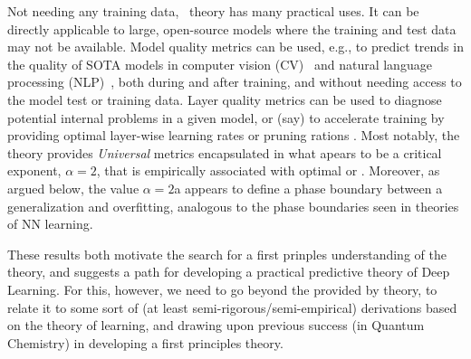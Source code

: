 Not needing any training data, \HTSR~theory has many practical uses.
It can be directly applicable to large, open-source  models where the training and test data may not be available.
Model quality metrics can be used, e.g., to predict trends in the quality of SOTA models in computer vision (CV)~\cite{MM20a_trends_NatComm} and natural language processing (NLP)~\cite{YTHx22_TR,YTHx23_KDD}, both during and after training, and without needing access to the model test or training data.
Layer quality metrics can be used to diagnose potential internal problems in a given model, or (say) to accelerate training by providing optimal layer-wise learning rates \cite{NEURIPS2023_CHM} or pruning rations \cite{alphapruning_NEURIPS2024}.
%
Most notably, the \HTSR theory provides \emph{Universal} \LayerQuality metrics encapsulated in what apears to be a critical exponent, $\alpha=2$, that is empirically associated with optimal or \IdealLearning. Moreover, as argued below, the
value $\alpha=2$a appears to define a phase boundary between a generalization and overfitting, analogous
to the phase boundaries seen in \STATMECH theories of NN learning. 

These results both motivate the search for a first prinples understanding of the \HTSR theory, 
and suggests a path for developing a practical predictive theory of Deep Learning.
For this, however, we need to go beyond the \Phenomenology provided by \HTSR theory, to relate it to some sort of (at least semi-rigorous/semi-empirical) derivations based on the \STATMECH theory of learning, and drawing
upon previous success (in Quantum Chemistry) in developing a first principles \SemiEmpirical theory. 

